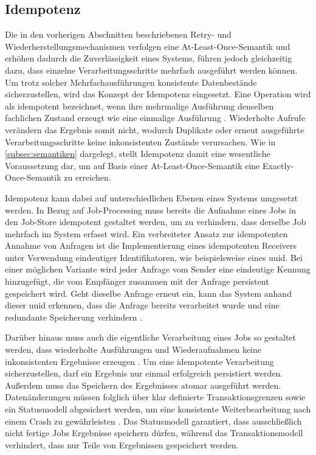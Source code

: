 \subsection{Idempotenz}
\label{subsec:idempotenz}
Die in den vorherigen Abschnitten beschriebenen Retry- und Wiederherstellungsmechanismen verfolgen eine At-Least-Once-Semantik und
erhöhen dadurch die Zuverlässigkeit eines Systems, führen jedoch gleichzeitig dazu, dass einzelne Verarbeitungsschritte
mehrfach ausgeführt werden können.
Um trotz solcher Mehrfachausführungen konsistente Datenbestände sicherzustellen, wird das Konzept der Idempotenz eingesetzt.
Eine Operation wird als idempotent bezeichnet, wenn ihre mehrmalige Ausführung denselben fachlichen Zustand erzeugt wie eine
einmalige Ausführung \parencite[Kap.~3 Abschnitt \glqq Idempotency\grqq]{newman_building_2026}.
Wiederholte Aufrufe verändern das Ergebnis somit nicht, wodurch Duplikate oder erneut ausgeführte Verarbeitungsschritte
keine inkonsistenten Zustände verursachen.
Wie in \cref{subsec:semantiken} dargelegt, stellt Idempotenz damit eine wesentliche Voraussetzung dar, um auf Basis einer
At-Least-Once-Semantik eine Exactly-Once-Semantik zu erreichen.

Idempotenz kann dabei auf unterschiedlichen Ebenen eines Systems umgesetzt werden.
In Bezug auf Job-Processing muss bereits die Aufnahme eines Jobs in den Job-Store idempotent gestaltet werden, um zu verhindern,
dass derselbe Job mehrfach im System erfasst wird.
Ein verbreiteter Ansatz zur idempotenten Annahme von Anfragen ist die Implementierung eines idempotenten Receivers
\parencite[Kap.~10 Abschnitt \glqq Idempotent Receiver\grqq]{hohpe_enterprise_2005} unter Verwendung eindeutiger Identifikatoren,
wie beispielsweise eines \gls{uuid}.
Bei einer möglichen Variante wird jeder Anfrage vom Sender eine eindeutige Kennung hinzugefügt, die vom Empfänger zusammen
mit der Anfrage persistent gespeichert wird.
Geht dieselbe Anfrage erneut ein, kann das System anhand dieser \gls{uuid} erkennen, dass die Anfrage bereits verarbeitet wurde
und eine redundante Speicherung verhindern \parencites[{Kap.~3 Abschnitt \glqq Client Request IDs\grqq}]{newman_building_2026}[Kap.~3.3.6]{richardson_microservices_2018}.

Darüber hinaus muss auch die eigentliche Verarbeitung eines Jobs so gestaltet werden, dass wiederholte Ausführungen und
Wiederaufnahmen keine inkonsistenten Ergebnisse erzeugen \parencite[Kap.~3 Abschnitt \glqq Idempotency\grqq]{newman_building_2026}.
Um eine idempotente Verarbeitung sicherzustellen, darf ein Ergebnis nur einmal erfolgreich persistiert werden.
Außerdem muss das Speichern des Ergebnisses atomar ausgeführt werden.
Datenänderungen müssen folglich über klar definierte Transaktionsgrenzen sowie ein Statusmodell abgesichert werden, um
eine konsistente Weiterbearbeitung nach einem Crash zu gewährleisten \parencite[Kap.~7]{kleppmann_designing_2017}.
Das Statusmodell garantiert, dass ausschließlich nicht fertige Jobs Ergebnisse speichern dürfen, während das Transaktionsmodell
verhindert, dass nur Teile von Ergebnissen gespeichert werden.

